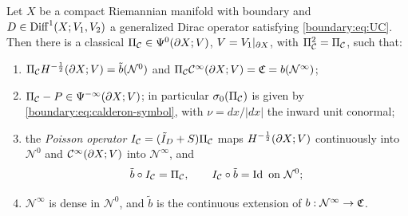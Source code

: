 \begin{theorem}\label{boundary:thm:calderon}
Let $X$ be a compact Riemannian manifold with boundary and $D\in\operatorname{Diff}^{1}(X;V_1,V_2)$ a
generalized Dirac operator satisfying \eqref{boundary:eq:UC}. Then there is a classical
$\Pi_{\mathcal{C}}\in\Psi^{0}(\partial X;V)$, $V=V_1|_{\partial X}$, with $\Pi_{\mathcal{C}}^2=\Pi_{\mathcal{C}}$, such that:
\begin{enumerate}[label=(\roman*)]
\item $\Pi_{\mathcal{C}} H^{-\frac12}(\partial X;V)=\tilde b(\mathcal{N}^0)$ and $\Pi_{\mathcal{C}}\mathcal{C}^\infty(\partial X;V)=\mathfrak{C}=
b(\mathcal{N}^\infty)$;
\item $\Pi_{\mathcal{C}}-P\in\Psi^{-\infty}(\partial X;V)$; in particular $\sigma_0(\Pi_{\mathcal{C}})$ is given by
\eqref{boundary:eq:calderon-symbol}, with $\nu=dx/|dx|$ the inward unit conormal;
\item the \emph{Poisson operator} $I_{\mathcal C}=(\tilde I_D+S)\Pi_{\mathcal{C}}$ maps $H^{-\frac12}
(\partial X;V)$ continuously into $\mathcal{N}^0$ and $\mathcal{C}^\infty(\partial X;V)$ into $\mathcal{N}^\infty$,
and
\begin{equation*}
\tilde b\circ I_{\mathcal C}=\Pi_{\mathcal{C}},\qquad I_{\mathcal C}\circ\tilde b=\operatorname{Id}\ \text{on}\
\mathcal{N}^0;
\end{equation*}
\item $\mathcal{N}^\infty$ is dense in $\mathcal{N}^0$, and $\tilde b$ is the continuous
extension of $b:\mathcal{N}^\infty\to\mathfrak{C}$.
\end{enumerate}
\end{theorem}
